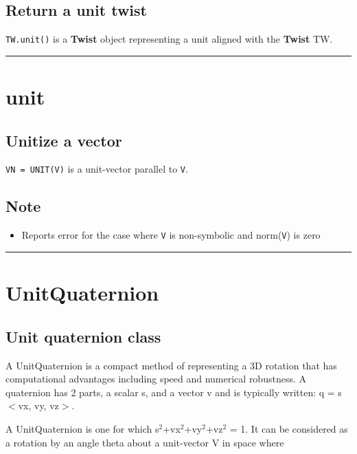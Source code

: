 \subsection*{Return a unit twist}


\texttt{TW.unit()} is a \textbf{\color{red} Twist} object representing a unit aligned with the \textbf{\color{red} Twist}
TW.

\vspace{1.5ex}\rule{\textwidth}{1mm}

\hypertarget{unit}{\section*{unit}}
\subsection*{Unitize a vector}


\texttt{VN = UNIT(V)} is a unit-vector parallel to \texttt{V}.


\subsection*{Note}
\begin{itemize}
  \item Reports error for the case where \texttt{V} is non-symbolic and norm(\texttt{V}) is zero
\end{itemize}
\vspace{1.5ex}\rule{\textwidth}{1mm}

\hypertarget{UnitQuaternion}{\section*{UnitQuaternion}}
\subsection*{Unit quaternion class}


A UnitQuaternion is a compact method of representing a 3D rotation that has
computational advantages including speed and numerical robustness.
A quaternion has 2 parts, a scalar s, and a vector v and is typically
written: q = s $<$vx, vy, vz$>$.



A UnitQuaternion is one for which s${}^{2}$+vx${}^{2}$+vy${}^{2}$+vz${}^{2}$ = 1.  It can be
considered as a rotation by an angle theta about a unit-vector V in space where


